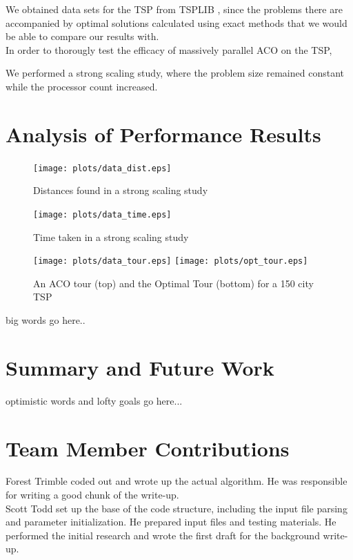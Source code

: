\documentclass[twocolumn]{article}
\begin{document}
We obtained data sets for the TSP from TSPLIB \cite{tsplib}, since the problems
there are accompanied by optimal solutions calculated using exact methods that
we would be able to compare our results with. \\

In order to thorougly test the efficacy of massively parallel ACO on the TSP,


We performed a strong scaling study, where the problem size remained constant
while the processor count increased.\\


\section{Analysis of Performance Results}

\begin{figure}
  \centering
  \texttt{[image: plots/data\_dist.eps]}
  \caption{Distances found in a strong scaling study}
\end{figure}

\begin{figure}
  \centering
  \texttt{[image: plots/data\_time.eps]}
  \caption{Time taken in a strong scaling study}
\end{figure}

\begin{figure}
  \centering
  \texttt{[image: plots/data\_tour.eps]}
  \texttt{[image: plots/opt\_tour.eps]}
  \caption{An ACO tour (top) and the Optimal Tour (bottom) for a 150 city TSP}
\end{figure}

big words go here..\\


\section{Summary and Future Work}

optimistic words and lofty goals go here...\\

\section{Team Member Contributions}

\noindent Forest Trimble coded out and wrote up the actual algorithm. He was 
responsible for writing a good chunk of the write-up. \\

\noindent Scott Todd set up the base of the code structure, including the input
file parsing and parameter initialization. He prepared input files and testing
materials. He performed the initial research and wrote the first draft for the
background write-up.

\nocite{*}


\end{document}
